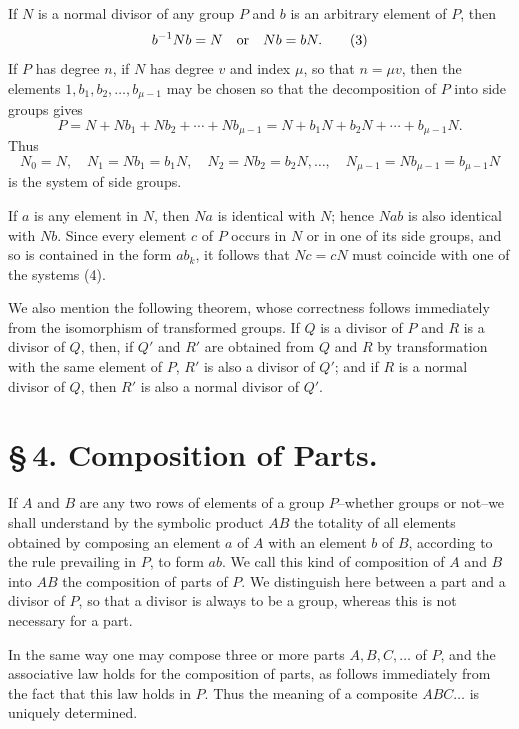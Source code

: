 \documentclass[11pt]{article}
\begin{document}
If $N$ is a normal divisor of any group $P$ and $b$ is an arbitrary element of $P$, then
\begin{equation}
b^{-1}Nb=N\quad\hbox{or}\quad Nb=bN.
\tag{3}
\end{equation}
If $P$ has degree $n$, if $N$ has degree $v$ and index $\mu$, so that $n=\mu v$, then the elements $1,b_1,b_2,\ldots,b_{\mu-1}$ may be chosen so that the decomposition of $P$ into side groups gives
\[
P=N+Nb_1+Nb_2+\cdots+Nb_{\mu-1}=N+b_1N+b_2N+\cdots+b_{\mu-1}N.
\]
Thus
\begin{equation}
N_0=N,
\quad N_1=Nb_1=b_1N,
\quad N_2=Nb_2=b_2N,
\ldots,
\quad N_{\mu-1}=Nb_{\mu-1}=b_{\mu-1}N
\tag{4}
\end{equation}
is the system of side groups.

If $a$ is any element in $N$, then $Na$ is identical with $N$; hence $Nab$ is also identical with $Nb$. Since every element $c$ of $P$ occurs in $N$ or in one of its side groups, and so is contained in the form $ab_k$, it follows that $Nc=cN$ must coincide with one of the systems (4).

We also mention the following theorem, whose correctness follows immediately from the isomorphism of transformed groups. If $Q$ is a divisor of $P$ and $R$ is a divisor of $Q$, then, if $Q'$ and $R'$ are obtained from $Q$ and $R$ by transformation with the same element of $P$, $R'$ is also a divisor of $Q'$; and if $R$ is a normal divisor of $Q$, then $R'$ is also a normal divisor of $Q'$.

\section*{\S\,4. Composition of Parts.}

If $A$ and $B$ are any two rows of elements of a group $P$--whether groups or not--we shall understand by the symbolic product $AB$ the totality of all elements obtained by composing an element $a$ of $A$ with an element $b$ of $B$, according to the rule prevailing in $P$, to form $ab$. We call this kind of composition of $A$ and $B$ into $AB$ the composition of parts of $P$. We distinguish here between a part and a divisor of $P$, so that a divisor is always to be a group, whereas this is not necessary for a part.

In the same way one may compose three or more parts $A,B,C,\ldots$ of $P$, and the associative law holds for the composition of parts, as follows immediately from the fact that this law holds in $P$. Thus the meaning of a composite $ABC\ldots$ is uniquely determined.
\end{document}
